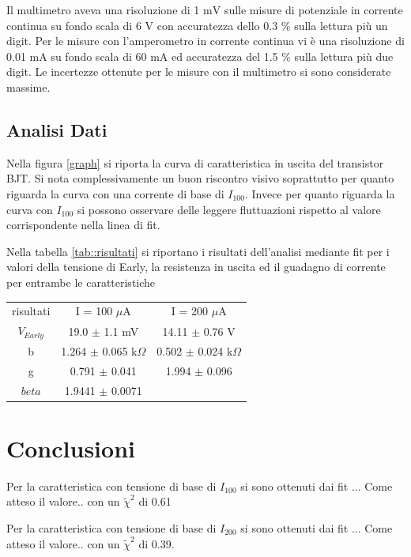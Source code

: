 \documentclass[a4paper,11pt]{article}
\begin{document}
Il multimetro aveva una risoluzione di 1 $\mathrm{mV}$ sulle misure di potenziale in corrente continua su fondo scala di 6 $\mathrm{V}$ con accuratezza dello 0.3 $\%$ sulla lettura più un digit. Per le misure con l'amperometro in corrente continua vi è una risoluzione di 0.01 $\mathrm{mA}$ su fondo scala di 60 $\mathrm{mA}$ ed accuratezza del 1.5 $\%$ sulla lettura più due digit. Le incertezze ottenute per le misure con il multimetro si sono considerate massime.

\subsection{Analisi Dati} 

Nella figura \ref{graph} si riporta la curva di caratteristica in uscita del transistor BJT. Si nota complessivamente un buon riscontro visivo soprattutto per quanto riguarda la curva con una corrente di base di $I_100$. Invece per quanto riguarda la curva con $I_100$ si possono osservare delle leggere fluttuazioni rispetto al valore corrispondente nella linea di fit.

Nella tabella \ref{tab::risultati} si riportano i risultati dell'analisi mediante fit per i valori della tensione di Early, la resistenza in uscita ed il guadagno di corrente per entrambe le caratteristiche

\begin{center}
\begin{tabular}{ c c c }
 risultati & I = 100 $\mu$A & I = 200 $\mu$A \\ 
 $V_{Early}$ & 19.0 $\pm$ 1.1 mV & 14.11 $\pm$ 0.76 V \\  
 b & 1.264 $\pm$ 0.065 k$\Omega$ & 0.502 $\pm$ 0.024 k$\Omega$ \\
 g & 0.791 $\pm$ 0.041 & 1.994 $\pm$ 0.096 \\
 $beta$ & 1.9441 $\pm$ 0.0071 \\
\end{tabular} \label{tab::risultati}
\end{center}

\section{Conclusioni}
Per la caratteristica con tensione di base di $I_{100}$ si sono ottenuti dai fit ... Come atteso il valore..
con un $\tilde\chi^2$ di 0.61

Per la caratteristica con tensione di base di $I_{200}$ si sono ottenuti dai fit ... Come atteso il valore..
con un $\tilde\chi^2$ di 0.39.
\end{document}
